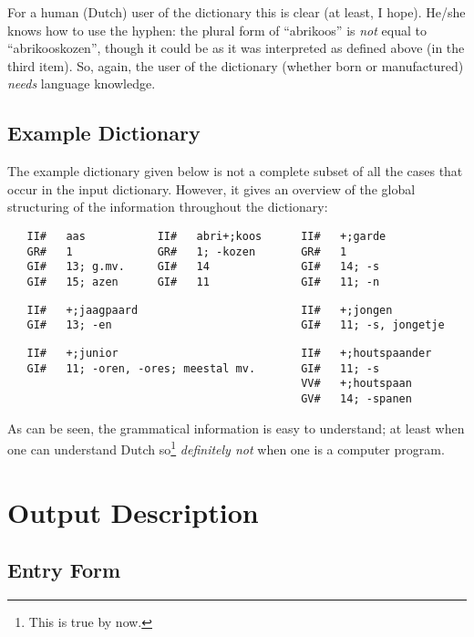For a human (Dutch) user of the dictionary this is clear (at least, I hope). 
He/she knows how to use the hyphen: the plural form of ``abrikoos'' is {\em not}
equal to ``abrikooskozen'', though it could be as it was interpreted as
defined above (in the third item). So, again, the user of the dictionary (whether 
born or manufactured) {\em needs} language knowledge.

\subsection{Example Dictionary}

The example dictionary given below is not a complete subset of all the cases 
that occur in the input dictionary. However, it gives an overview of the 
global structuring of the information throughout the dictionary:

\begin{verbatim}
   II#   aas           II#   abri+;koos      II#   +;garde
   GR#   1             GR#   1; -kozen       GR#   1
   GI#   13; g.mv.     GI#   14              GI#   14; -s
   GI#   15; azen      GI#   11              GI#   11; -n
\end{verbatim}

\begin{verbatim}
   II#   +;jaagpaard                         II#   +;jongen
   GI#   13; -en                             GI#   11; -s, jongetje
\end{verbatim}

\begin{verbatim}
   II#   +;junior                            II#   +;houtspaander
   GI#   11; -oren, -ores; meestal mv.       GI#   11; -s
                                             VV#   +;houtspaan
                                             GV#   14; -spanen
\end{verbatim}

As can be seen, the grammatical information is easy to understand; at least 
when one can understand Dutch so\footnote{This is true by now.} {\em definitely 
not} when one is a computer program. 

\newpage
\section{Output Description}

\subsection{Entry Form}

